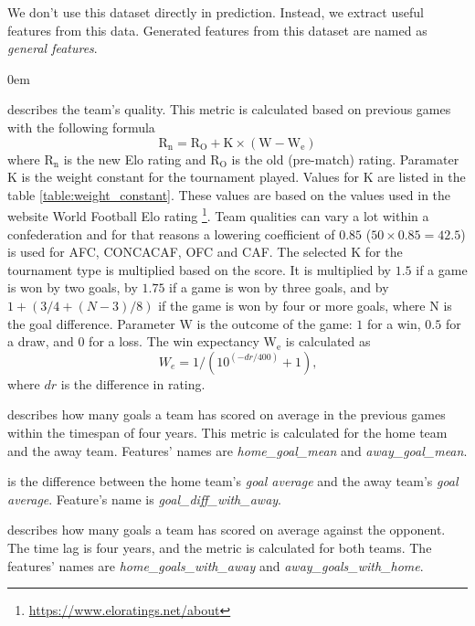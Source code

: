 We don't use this dataset directly in prediction. Instead, we extract useful features from this data. Generated features from this dataset are named as \textit{general features}.
\renewcommand{\labelitemi}{}
\begin{description}
    \itemsep0em
    \item[Elo rating] describes the team's quality. This metric is calculated based on previous games with the following formula \begin{equation}
        \mathrm { R } _ { \mathrm { n } } = \mathrm { R } _ { \mathrm { O } } + \mathrm { K } \times \left( \mathrm { W } - \mathrm { W } _ { \mathrm { e } } \right)
    \end{equation}
    where $\mathrm { R } _ { \mathrm { n } }$ is the new Elo rating and $\mathrm { R }  _ { \mathrm { O } }$ is the old (pre-match) rating. Paramater $\mathrm { K }$ is the weight constant for the tournament played. Values for $\mathrm { K }$ are listed in the table \ref{table:weight_constant}. These values are based on the values used in the website World Football Elo rating \footnote{\url{https://www.eloratings.net/about}}. Team qualities can vary a lot within a confederation and for that reasons a lowering coefficient of $0.85$ ($50 \times 0.85 = 42.5$) is used for AFC, CONCACAF, OFC and CAF. The selected $\mathrm { K }$ for the tournament type is multiplied based on the score. It is multiplied by $1.5$ if a game is won by two goals, by $1.75$ if a game is won by three goals, and by $1 + (3/4 + (N-3)/8)$ if the game is won by four or more goals, where N is the goal difference. Parameter $\mathrm { W }$ is the outcome of the game: $1$ for a win, $0.5$ for a draw, and $0$ for a loss. The win expectancy $\mathrm { W } _ { \mathrm { e } }$ is calculated as
    \begin{equation}
        W _ { e } = 1 / \left( 10 ^ { ( - d r / 400 ) } + 1 \right)\text{,}
    \end{equation}
    where $dr$ is the difference in rating.

    \item[Goal average] describes how many goals a team has scored on average in the previous games within the timespan of four years. This metric is calculated for the home team and the away team. Features' names are \textit{home\_goal\_mean} and \textit{away\_goal\_mean}.
    \item[Goal average difference] is the difference between the home team's \textit{goal average} and the away team's \textit{goal average}. Feature's name is \textit{goal\_diff\_with\_away}.
    \item[Goal average with the opponent] describes how many goals a team has scored on average against the opponent. The time lag is four years, and the metric is calculated for both teams. The features' names are \textit{home\_goals\_with\_away} and \textit{away\_goals\_with\_home}.
\end{description}

